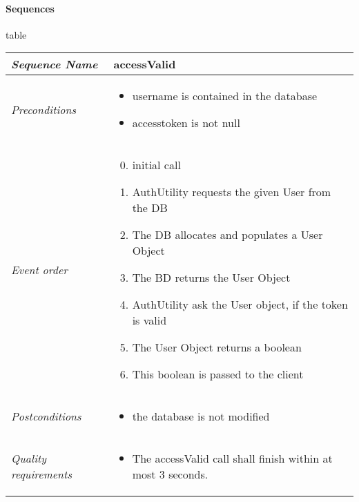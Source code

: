 	\paragraph{Sequences} table  \\
		\begin{tabular}{|p{}|p{}|}
			\hline
			\textit{Sequence Name}&\textbf{accessValid}\\
			\hline
			\textit{Preconditions}&
			\begin{itemize}
				\item username is contained in the database
				\item accesstoken is not null
			\end{itemize}\\
			\hline
			\textit{Event order}&
			\begin{enumerate}[label*=1.\arabic*]
				\setcounter{enumi}{-1}
				\item initial call
				\item AuthUtility requests the given User from the DB
				\item The DB allocates and populates a User Object
				\item The BD returns the User Object
				\item AuthUtility ask the User object, if the token is valid
				\item The User Object returns a boolean
				\item This boolean is passed to the client
			\end{enumerate}\\
			\hline
			\textit{Postconditions}&
			\begin{itemize}
				\item the database is not modified
			\end{itemize}\\
			\hline
			\textit{Quality requirements}&
			\begin{itemize}
				\item The accessValid call shall finish within at most 3 seconds.
			\end{itemize}\\
			\hline
		\end{tabular}

